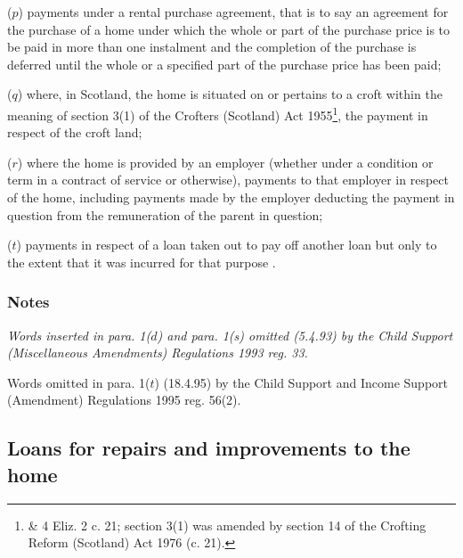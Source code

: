 \documentclass[a4paper]{article}
\newcommand\amendment[1]{\subsubsection*{Notes}{\itshape\frenchspacing\footnotesize #1 \par\goodbreak}}
\begin{document}
\begin{enumerate}
($p$) payments under a rental purchase agreement, that is to say an agreement for the purchase of a home under which the whole or part of the purchase price is to be paid in more than one instalment and the completion of the purchase is deferred until the whole or a specified part of the purchase price has been paid;

($q$) where, in Scotland, the home is situated on or pertains to a croft within the meaning of section 3(1) of the Crofters (Scotland) Act 1955\footnote{ \& 4 Eliz. 2 c. 21; section 3(1) was amended by section 14 of the Crofting Reform (Scotland) Act 1976 (c. 21).}, the payment in respect of the croft land;

($r$) where the home is provided by an employer (whether under a condition or term in a contract of service or otherwise), payments to that employer in respect of the home, including payments made by the employer deducting the payment in question from the remuneration of the parent in question;


($t$) payments in respect of a loan taken out to pay off another loan but only to the extent that it was incurred for that purpose%
.
\end{enumerate}

\amendment{
Words inserted in para. 1($d$) and para. 1(s) omitted (5.4.93) by the Child Support (Miscellaneous Amendments) Regulations 1993 reg. 33.

Words omitted in para. 1($t$) (18.4.95) by the Child Support and Income Support (Amendment) Regulations 1995 reg. 56(2).
}

\subsection*{Loans for repairs and improvements to the home}
\end{document}
